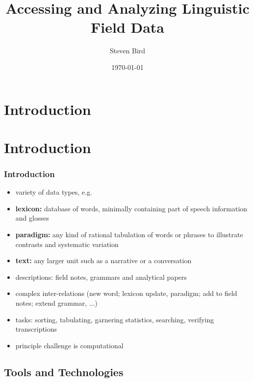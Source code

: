 \documentclass{beamer}
\title{Accessing and Analyzing Linguistic Field Data}
\author{Steven Bird}
\institute{
  University of Melbourne, AUSTRALIA
}
\date{\today}
\begin{document}
\section{Introduction}

\begin{frame}
  \titlepage
\end{frame}


\section{Introduction}

\begin{frame}
  \frametitle{Introduction}
  \begin{itemize}
  \item variety of data types, e.g.
  \item \textbf{lexicon:} database of words, minimally containing part
    of speech information and glosses
  \item \textbf{paradigm:} any kind of rational
    tabulation of words or phrases to illustrate contrasts and systematic
    variation
  \item \textbf{text:} any larger unit such as a narrative or a
    conversation
  \item descriptions: field notes, grammars and analytical papers
  \item complex inter-relations (new word; lexicon update, paradigm;
    add to field notes; extend grammar, ...)
  \item tasks: sorting, tabulating, garnering statistics, searching,
  verifying transcriptions
  \item principle challenge is computational
  \end{itemize}

\end{frame}

\subsection{Tools and Technologies}
\end{document}
